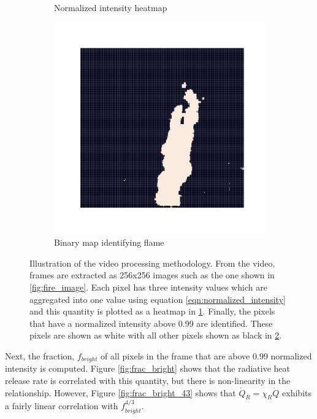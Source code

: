 \documentclass{article}
\begin{document}
\begin{figure}[htbp]
\begin{subfigure}[t]{.4\textwidth}
      \caption{Normalized intensity heatmap}
      \label{fig:brightness_heatmap}
  \end{subfigure}
  \begin{subfigure}[t]{.35\textwidth}
      \centering
      \includegraphics[width=\textwidth ,keepaspectratio]{figures/binary_fire_image.pdf}
      \caption{Binary map identifying flame}
      \label{fig:binary_fire_image}
  \end{subfigure}
  \caption{Illustration of the video processing methodology. From the video, frames are extracted as 256x256 images such as the one shown in \protect\ref{fig:fire_image}. Each pixel has three intensity values which are aggregated into one value using equation \protect\ref{eqn:normalized_intensity} and this quantity is plotted as a heatmap in \protect\ref{fig:brightness_heatmap}. Finally, the pixels that have a normalized intensity above 0.99 are identified. These pixels are shown as white with all other pixels shown as black in \protect\ref{fig:binary_fire_image}.} 
  \label{fig:fire_image_processing}
\end{figure}

Next, the fraction, $f_{bright}$ of all pixels in the frame that are above 0.99 normalized intensity is computed. Figure \ref{fig:frac_bright} shows that the radiative heat release rate is correlated with this quantity, but there is non-linearity in the relationship. However, Figure \ref{fig:frac_bright_43} shows that $\dot{Q}_R = \chi_R\dot{Q}$ exhibits a fairly linear correlation with $f_{bright}^{4/3}$.
\end{document}
